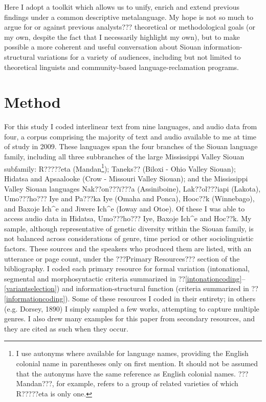 \documentclass[output=paper]{LSP/langsci}
\begin{document}
	Here I adopt a toolkit which allows us to unify, enrich and extend previous findings under a common descriptive metalanguage. My hope is not so much to argue for or against previous analysts??? theoretical or methodological goals (or my own, despite the fact that I necessarily highlight my own), but to make possible a more coherent and useful conversation about Siouan information-structural variations for a variety of audiences, including but not limited to theoretical linguists and community-based language-reclamation programs.

\section{Method}

For this study I coded interlinear text from nine languages, and audio data from four, a corpus comprising the majority of text and audio available to me at time of study in 2009. These languages span the four branches of the Siouan language family, including all three subbranches of the large Mississippi Valley Siouan subfamily: R?????eta (Mandan\footnote{I use autonyms where available for language names, providing the English colonial name in parentheses only on first mention. It should not be assumed that the autonyms have the same reference as English colonial names. ???Mandan???, for example, refers to a group of related varieties of which R?????eta is only one.}); Taneks?? (Biloxi - Ohio Valley Siouan); Hidatsa and Apsaalooke (Crow - Missouri Valley Siouan); and the Mississippi Valley Siouan languages Nak??on???i???a (Assiniboine), Lak??ol???iapi (Lakota), Umo???ho??? Iye and Pa???ka Iye (Omaha and Ponca), Hooc??k (Winnebago), and Baxoje Ich\^{}e and Jiwere Ich\^{}e (Ioway and Otoe). Of these I was able to access audio data in Hidatsa, Umo???ho??? Iye, Baxoje Ich\^{}e and Hoc??k. My sample, although representative of genetic diversity within the Siouan family, is not balanced across considerations of genre, time period or other sociolinguistic factors. These sources and the speakers who produced them are listed, with an utterance or page count, under the ???Primary Resources??? section of the bibliography. I coded each primary resource for formal variation (intonational, segmental and morphosyntactic criteria summarized in ??\ref{intonationcoding}--\ref{variantselection}) and information-structural function (criteria summarized in ??\ref{informationcoding}). Some of these resources I coded in their entirety; in others (e.g. Dorsey, 1890) I simply sampled a few works, attempting to capture multiple genres. I also drew many examples for this paper from secondary resources, and they are cited as such when they occur.
\end{document}
